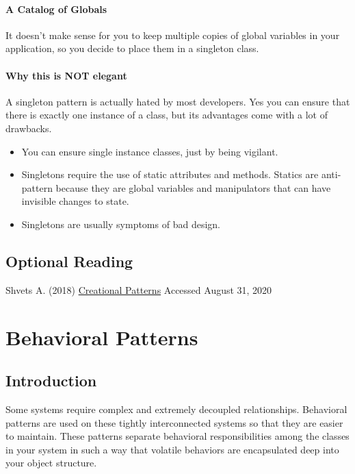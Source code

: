 \subsubsection{A Catalog of
Globals}\label{creational-patterns.md__a-catalog-of-globals}

It doesn't make sense for you to keep multiple copies of global
variables in your application, so you decide to place them in a
singleton class.

\subsubsection{Why this is NOT
elegant}\label{creational-patterns.md__why-this-is-not-elegant}

A singleton pattern is actually hated by most developers. Yes you can
ensure that there is exactly one instance of a class, but its advantages
come with a lot of drawbacks.

\begin{itemize}
\tightlist
\item
  You can ensure single instance classes, just by being vigilant.
\item
  Singletons require the use of static attributes and methods. Statics
  are anti-pattern because they are global variables and manipulators
  that can have invisible changes to state.
\item
  Singletons are usually symptoms of bad design.
\end{itemize}

\section{Optional
Reading}\label{creational-patterns.md__optional-reading}

Shvets A. (2018)
\href{https://sourcemaking.com/design_patterns/creational_patterns}{Creational
Patterns} Accessed August 31, 2020

\chapter{Behavioral
Patterns}\label{behavioral-patterns.md__behavioral-patterns}

\section{Introduction}\label{behavioral-patterns.md__introduction}

Some systems require complex and extremely decoupled relationships.
Behavioral patterns are used on these tightly interconnected systems so
that they are easier to maintain. These patterns separate behavioral
responsibilities among the classes in your system in such a way that
volatile behaviors are encapsulated deep into your object structure.

